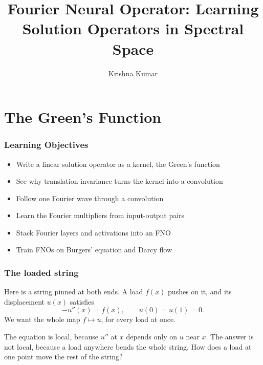 \documentclass{beamer}
\title[FNO: Operator Learning in Spectral Space]{Fourier Neural Operator: Learning Solution Operators in Spectral Space}
\author{Krishna Kumar} %
\institute[UT Austin] %
{
University of Texas at Austin \\
\medskip
\textit{
  \url{krishnak@utexas.edu}} %
}
\date{} %
\begin{document}
\begin{frame}[shrink=5]
\titlepage %
\end{frame}



\section{The Green's Function}

\begin{frame}
\frametitle{Learning Objectives}
\begin{itemize}
\item Write a linear solution operator as a kernel, the Green's function
\item See why translation invariance turns the kernel into a convolution
\item Follow one Fourier wave through a convolution
\item Learn the Fourier multipliers from input-output pairs
\item Stack Fourier layers and activations into an FNO
\item Train FNOs on Burgers' equation and Darcy flow
\end{itemize}
\vspace{0.3cm}
\centering
\href{https://colab.research.google.com/github/kks32-courses/sciml/blob/main/docs/05-fno/fno-intuition.ipynb}{}
\href{https://colab.research.google.com/github/kks32-courses/sciml/blob/main/docs/05-fno/fno-cnn-comparisons.ipynb}{}
\href{https://colab.research.google.com/github/kks32-courses/sciml/blob/main/docs/05-fno/fno.ipynb}{}
\end{frame}

\begin{frame}
\frametitle{The loaded string}
Here is a string pinned at both ends.
A load $f(x)$ pushes on it, and its displacement $u(x)$ satisfies
\[
-u''(x)=f(x),\qquad u(0)=u(1)=0.
\]
We want the whole map $f\mapsto u$, for every load at once.
\bigskip

The equation is local, because $u''$ at $x$ depends only on $u$ near $x$.
The answer is not local, because a load anywhere bends the whole string.
How does a load at one point move the rest of the string?
\end{frame}
\end{document}
